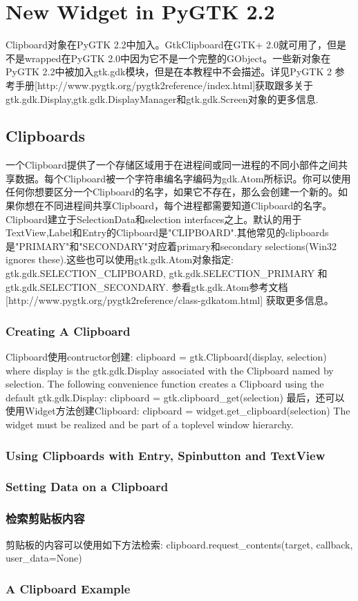 \chapter{New Widget in PyGTK 2.2}
Clipboard对象在PyGTK 2.2中加入。GtkClipboard在GTK+ 2.0就可用了，但是不是wrapped在PyGTK 2.0中因为它不是一个完整的GObject。一些新对象在PyGTK 2.2中被加入gtk.gdk模块，但是在本教程中不会描述。详见PyGTK 2 参考手册[http://www.pygtk.org/pygtk2reference/index.html]获取跟多关于gtk.gdk.Display,gtk.gdk.DisplayManager和gtk.gdk.Screen对象的更多信息.
\section{Clipboards}
一个Clipboard提供了一个存储区域用于在进程间或同一进程的不同小部件之间共享数据。每个Clipboard被一个字符串编名字编码为gdk.Atom所标识。你可以使用任何你想要区分一个Clipboard的名字，如果它不存在，那么会创建一个新的。如果你想在不同进程间共享Clipboard，每个进程都需要知道Clipboard的名字。
Clipboard建立于SelectionData和selection interfaces之上。默认的用于TextView,Label和Entry的Clipboard是"CLIPBOARD".其他常见的clipboards是"PRIMARY"和"SECONDARY"对应着primary和secondary selections(Win32 ignores these).这些也可以使用gtk.gdk.Atom对象指定: gtk.gdk.SELECTION_CLIPBOARD, gtk.gdk.SELECTION_PRIMARY 和 gtk.gdk.SELECTION_SECONDARY. 参看gtk.gdk.Atom参考文档[http://www.pygtk.org/pygtk2reference/class-gdkatom.html] 获取更多信息。
	\subsection{Creating A Clipboard}
Clipboard使用contructor创建:
clipboard = gtk.Clipboard(display, selection)
where display is the gtk.gdk.Display associated with the Clipboard named by selection. The following convenience function creates a Clipboard using the default gtk.gdk.Display:
clipboard = gtk.clipboard_get(selection)
最后，还可以使用Widget方法创建Clipboard:
clipboard = widget.get_clipboard(selection)
The widget must be realized and be part of a toplevel window hierarchy.
	\subsection{Using Clipboards with Entry, Spinbutton and TextView}
	\subsection{Setting Data on a Clipboard}
	\subsection{检索剪贴板内容} %
剪贴板的内容可以使用如下方法检索:
clipboard.request_contents(target, callback, user_data=None)

	\subsection{A Clipboard Example}
